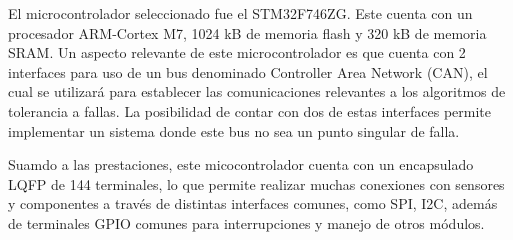 

El microcontrolador seleccionado fue el STM32F746ZG. Este cuenta con un procesador ARM-Cortex M7, 1024 kB de memoria flash y 320 kB de memoria SRAM. Un aspecto relevante de este microcontrolador es que cuenta con 2 interfaces para uso de un bus denominado Controller Area Network (CAN), el cual se utilizará para establecer las comunicaciones relevantes a los algoritmos de tolerancia a fallas. La posibilidad de contar con dos de estas interfaces permite implementar un sistema donde este bus no sea un punto singular de falla.

Suamdo a las prestaciones, este micocontrolador cuenta con un encapsulado LQFP de 144 terminales, lo que permite realizar muchas conexiones con sensores y componentes a través de distintas interfaces comunes, como SPI, I2C, además de terminales GPIO comunes para interrupciones y manejo de otros módulos.










